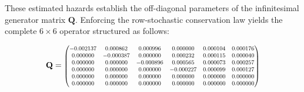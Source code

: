\documentclass[9pt,a4paper,twocolumn,twoside]{rho-class/rho}
\begin{document}
        \begin{table}[H]
        \centering
        \caption{Empirical Transition Events and Exposures for the 6-State Model}
        \label{tab:transition_rates}
        \end{table}

        These estimated hazards establish the off-diagonal parameters of the infinitesimal generator matrix $\mathbf{Q}$. Enforcing the row-stochastic conservation law yields the complete $6 \times 6$ operator structured as follows:
        
        \begin{equation}
        \small
        \mathbf{Q}=
        \scalebox{0.78}{$
        \begin{pmatrix}
        -0.002137 & 0.000862 & 0.000996 & 0.000000 & 0.000104 & 0.000176\\
         0.000000 & -0.000387 & 0.000000 & 0.000232 & 0.000115 & 0.000040\\
         0.000000 & 0.000000 & -0.000896 & 0.000565 & 0.000073 & 0.000257\\
         0.000000 & 0.000000 & 0.000000 & -0.000227 & 0.000099 & 0.000127\\
         0.000000 & 0.000000 & 0.000000 & 0.000000 & 0.000000 & 0.000000\\
         0.000000 & 0.000000 & 0.000000 & 0.000000 & 0.000000 & 0.000000
        \end{pmatrix}
        $}
        \end{equation}
\end{document}
